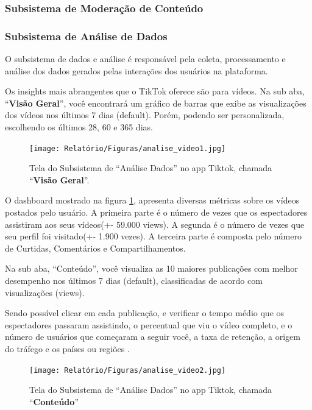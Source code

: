\newpage
\subsubsection{Subsistema de Moderação de Conteúdo}










\newpage
\subsubsection{Subsistema de Análise de Dados}

O subsistema de dados e análise é responsável pela coleta, processamento e análise dos dados gerados pelas interações dos usuários na plataforma.\vskip0.3cm


Os insights mais abrangentes que o TikTok oferece são para vídeos. Na sub aba, “\textbf{Visão Geral}”, você encontrará um gráfico de barras que exibe as visualizações dos vídeos nos últimos 7 dias (default). Porém, podendo ser personalizada, escolhendo os últimos 28, 60 e 365 dias.


\begin{figure}[H]
    \centering
    \texttt{[image: Relatório/Figuras/analise\_video1.jpg]}
    \caption{Tela do Subsistema de “Análise Dados” no app Tiktok, chamada “\textbf{Visão Geral}”.}
    \label{fig:enter-label2} 
\end{figure}

O dashboard mostrado na figura \ref{fig:enter-label2}, apresenta diversas métricas sobre os vídeos postados pelo usuário. A primeira parte é o número de vezes que os espectadores assistiram aos seus vídeos(+- 59.000 views). A segunda é o número de vezes que seu perfil foi visitado(+- 1.900 vezes). A terceira parte é composta pelo número de Curtidas, Comentários e Compartilhamentos.

\newpage
Na sub aba, “Conteúdo”, você visualiza as 10 maiores publicações com melhor desempenho nos últimos 7 dias (default), classificadas de acordo com visualizações (views).\vskip0.3cm

Sendo possível clicar em cada publicação, e verificar o tempo médio que os espectadores passaram assistindo, o percentual que viu o vídeo completo, e o número de usuários que começaram a seguir você, a taxa de retenção, a origem do tráfego e os países ou regiões .



\begin{figure}[H]
    \centering
    \texttt{[image: Relatório/Figuras/analise\_video2.jpg]}
    \caption{Tela do Subsistema de “Análise Dados” no app Tiktok, chamada “\textbf{Conteúdo}”}
    \label{fig:enter-label} 
\end{figure}

